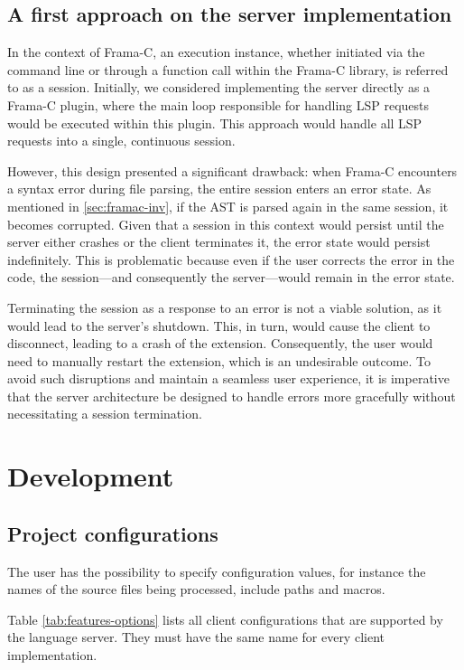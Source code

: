 \documentclass[10pt]{article}
\begin{document}
\begin{singlespace}
\subsection{A first approach on the server implementation}
In the context of Frama-C, an execution instance, whether initiated via the command line or through a function call within the Frama-C library, is referred to as a session. Initially, we considered implementing the server directly as a Frama-C plugin, where the main loop responsible for handling LSP requests would be executed within this plugin. This approach would handle all LSP requests into a single, continuous session.

However, this design presented a significant drawback: when Frama-C encounters a syntax error during file parsing, the entire session enters an error state.
As mentioned in \ref{sec:framac-inv}, if the AST is parsed again in the same session, it becomes corrupted.
Given that a session in this context would persist until the server either crashes or the client terminates it, the error state would persist indefinitely. This is problematic because even if the user corrects the error in the code, the session---and consequently the server---would remain in the error state.

Terminating the session as a response to an error is not a viable solution, as it would lead to the server's shutdown. This, in turn, would cause the client to disconnect, leading to a crash of the extension. Consequently, the user would need to manually restart the extension, which is an undesirable outcome. To avoid such disruptions and maintain a seamless user experience, it is imperative that the server architecture be designed to handle errors more gracefully without necessitating a session termination.

\section{Development}

\subsection{Project configurations}
The user has the possibility to specify configuration values, for instance the names of the source files being processed, include paths and macros. 

Table \ref{tab:features-options} lists all client configurations that are supported by the language server. They must have the same name for every client implementation.


\end{singlespace}
\end{document}
